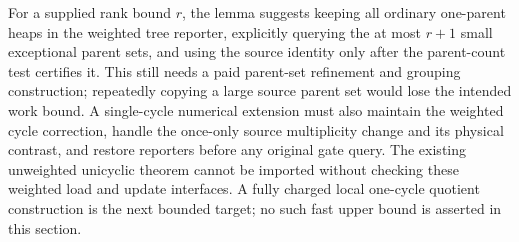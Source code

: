 For a supplied rank bound $r$, the lemma suggests keeping all ordinary
one-parent heaps in the weighted tree reporter, explicitly querying the
at most $r+1$ small exceptional parent sets, and using the source identity
only after the parent-count test certifies it. This still needs a paid
parent-set refinement and grouping construction; repeatedly copying a
large source parent set would lose the intended work bound.
A single-cycle numerical extension must also maintain the weighted cycle
correction, handle the once-only source multiplicity change and its
physical contrast, and restore reporters before any original gate query.
The existing unweighted unicyclic theorem cannot be imported without
checking these weighted load and update interfaces. A fully charged local
one-cycle quotient construction is the next bounded target; no such fast
upper bound is asserted in this section.
